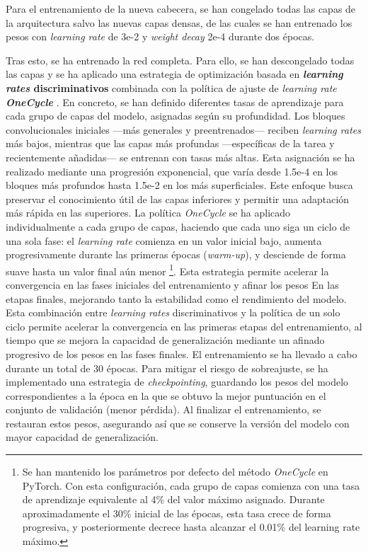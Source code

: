 Para el entrenamiento de la nueva cabecera, se han congelado todas las capas de la arquitectura salvo las nuevas capas densas, de las cuales se han entrenado los pesos con \textit{learning rate} de 3e-2 y \textit{weight decay} 2e-4 durante dos épocas.

Tras esto, se ha entrenado la red completa. Para ello, se han descongelado todas las capas y se ha aplicado una estrategia de optimización basada en \textbf{\textit{learning rates} discriminativos} combinada con la política de ajuste de \textit{learning rate \textbf{OneCycle}} \cite{smith2018}.
En concreto, se han definido diferentes tasas de aprendizaje para cada grupo de capas del modelo, asignadas según su profundidad. Los bloques convolucionales iniciales ---más generales y preentrenados--- reciben \textit{learning rates} más bajos, mientras que las capas más profundas ---específicas de la tarea y recientemente añadidas--- se entrenan con tasas más altas. Esta asignación se ha realizado mediante una progresión exponencial, que varía desde 1.5e-4 en los bloques más profundos hasta 1.5e-2 en los más superficiales. Este enfoque busca preservar el conocimiento útil de las capas inferiores y permitir una adaptación más rápida en las superiores.
La política \textit{OneCycle} se ha aplicado individualmente a cada grupo de capas, haciendo que cada uno siga un ciclo de una sola fase: el \textit{learning rate} comienza en un valor inicial bajo, aumenta progresivamente durante las primeras épocas (\textit{warm-up}), y desciende de forma suave hasta un valor final aún menor%
\footnote{
    Se han mantenido los parámetros por defecto del método \textit{OneCycle} en PyTorch. Con esta configuración, cada grupo de capas comienza con una tasa de aprendizaje equivalente al 4\% del valor máximo asignado. Durante aproximadamente el 30\% inicial de las épocas, esta tasa crece de forma progresiva, y posteriormente decrece hasta alcanzar el 0.01\% del learning rate máximo.
}. 
Esta estrategia permite acelerar la convergencia en las fases iniciales del entrenamiento y afinar los pesos En las etapas finales, mejorando tanto la estabilidad como el rendimiento del modelo.
Esta combinación entre \textit{learning rates} discriminativos y la política de un solo ciclo permite acelerar la convergencia en las primeras etapas del entrenamiento, al tiempo que se mejora la capacidad de generalización mediante un afinado progresivo de los pesos en las fases finales.
El entrenamiento se ha llevado a cabo durante un total de 30 épocas. Para mitigar el riesgo de sobreajuste, se ha implementado una estrategia de \textit{checkpointing}, guardando los pesos del modelo correspondientes a la época en la que se obtuvo la mejor puntuación en el conjunto de validación (menor pérdida). Al finalizar el entrenamiento, se restauran estos pesos, asegurando así que se conserve la versión del modelo con mayor capacidad de generalización.


